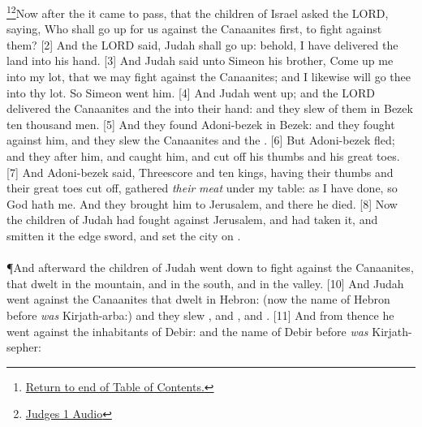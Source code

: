 \footnote{\textcolor[cmyk]{0.99998,1,0,0}{\hyperlink{TOC}{Return to end of Table of Contents.}}}\footnote{\href{https://audiobible.com/bible/judges_1.html}{\textcolor[cmyk]{0.99998,1,0,0}{Judges 1 Audio}}}\textcolor[cmyk]{0.99998,1,0,0}{Now after the  it came to pass, that the children of Israel asked the LORD, saying, Who shall go up for us against the Canaanites first, to fight against them?}
[2] \textcolor[cmyk]{0.99998,1,0,0}{And the LORD said, Judah shall go up: behold, I have delivered the land into his hand.}
[3] \textcolor[cmyk]{0.99998,1,0,0}{And Judah said unto Simeon his brother, Come up  me into my lot, that we may fight against the Canaanites; and I likewise will go  thee into thy lot. So Simeon went  him.}
[4] \textcolor[cmyk]{0.99998,1,0,0}{And Judah went up; and the LORD delivered the Canaanites and the  into their hand: and they slew of them in Bezek ten thousand men.}
[5] \textcolor[cmyk]{0.99998,1,0,0}{And they found Adoni-bezek in Bezek: and they fought against him, and they slew the Canaanites and the .}
[6] \textcolor[cmyk]{0.99998,1,0,0}{But Adoni-bezek fled; and they  after him, and caught him, and cut off his thumbs and his great toes.}
[7] \textcolor[cmyk]{0.99998,1,0,0}{And Adoni-bezek said, Threescore and ten kings, having their thumbs and their great toes cut off, gathered \emph{their} \emph{meat} under my table: as I have done, so God hath  me. And they brought him to Jerusalem, and there he died.}
[8] \textcolor[cmyk]{0.99998,1,0,0}{Now the children of Judah had fought against Jerusalem, and had taken it, and smitten it  the edge  sword, and set the city on .}\\
\\
\P \textcolor[cmyk]{0.99998,1,0,0}{And afterward the children of Judah went down to fight against the Canaanites, that dwelt in the mountain, and in the south, and in the valley.}
[10] \textcolor[cmyk]{0.99998,1,0,0}{And Judah went against the Canaanites that dwelt in Hebron: (now the name of Hebron before \emph{was} Kirjath-arba:) and they slew , and , and .}
[11] \textcolor[cmyk]{0.99998,1,0,0}{And from thence he went against the inhabitants of Debir: and the name of Debir before \emph{was} Kirjath-sepher:}
